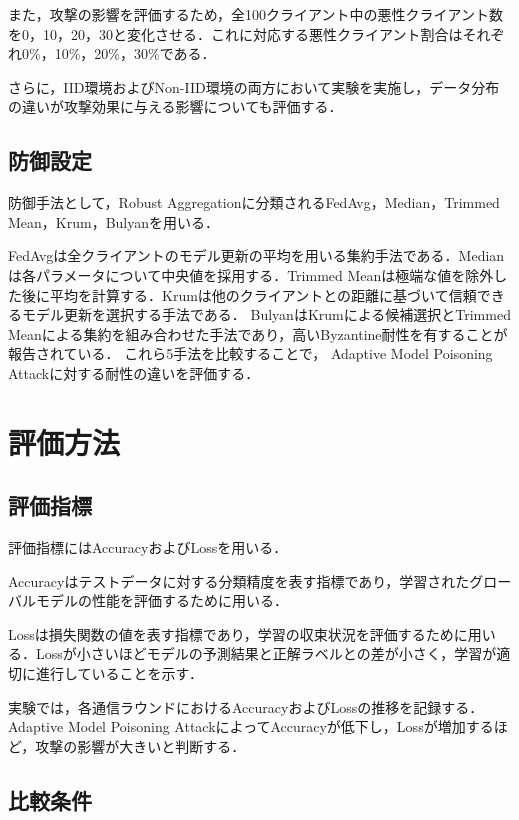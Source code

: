 \documentclass[a4j, twocolumn, dvipdfmx]{jsarticle}  %
\begin{document}
また，攻撃の影響を評価するため，全100クライアント中の悪性クライアント数を0，10，20，30と変化させる．これに対応する悪性クライアント割合はそれぞれ0\%，10\%，20\%，30\%である．

さらに，IID環境およびNon-IID環境の両方において実験を実施し，データ分布の違いが攻撃効果に与える影響についても評価する．

\subsection{防御設定}

防御手法として，Robust Aggregationに分類されるFedAvg，Median，Trimmed Mean，Krum，Bulyanを用いる．

FedAvgは全クライアントのモデル更新の平均を用いる集約手法である．Medianは各パラメータについて中央値を採用する．Trimmed Meanは極端な値を除外した後に平均を計算する．Krumは他のクライアントとの距離に基づいて信頼できるモデル更新を選択する手法である．
BulyanはKrumによる候補選択とTrimmed Meanによる集約を組み合わせた手法であり，高いByzantine耐性を有することが報告されている．
これら5手法を比較することで，
Adaptive Model Poisoning Attackに対する耐性の違いを評価する．

\section{評価方法}

\subsection{評価指標}

評価指標にはAccuracyおよびLossを用いる．

Accuracyはテストデータに対する分類精度を表す指標であり，学習されたグローバルモデルの性能を評価するために用いる．

Lossは損失関数の値を表す指標であり，学習の収束状況を評価するために用いる．Lossが小さいほどモデルの予測結果と正解ラベルとの差が小さく，学習が適切に進行していることを示す．

実験では，各通信ラウンドにおけるAccuracyおよびLossの推移を記録する．Adaptive Model Poisoning AttackによってAccuracyが低下し，Lossが増加するほど，攻撃の影響が大きいと判断する．



\subsection{比較条件}
\end{document}
